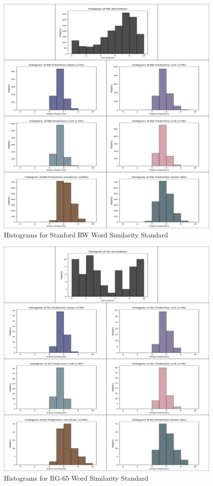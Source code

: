 \begin{figure}[p]
    \centering
    \includegraphics[width=1.0\textwidth]{img/rw_table.PNG}
    \caption{Histograms for Stanford RW Word Similarity Standard}
    \label{fig:rw_table}
\end{figure}

\begin{figure}[p]
    \centering
    \includegraphics[width=1.0\textwidth]{img/rg_table.PNG}
    \caption{Histograms for RG-65 Word Similarity Standard}
    \label{fig:rg_table}
\end{figure}


